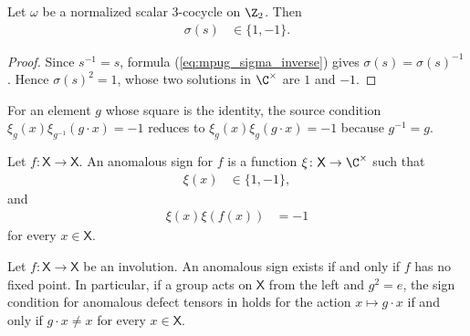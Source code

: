 \begin{lemma}
    \label{thm:mpug_z2_sigma_sign}
    \leanok
    Let $\omega$ be a normalized scalar $3$-cocycle on $\Z_2$. Then
    \begin{align}
        \sigma(s) & \in\{1,-1\}.
        \label{eq:mpug_z2_sigma_sign}
    \end{align}
\end{lemma}

\begin{proof}\leanok
    Since $s^{-1}=s$, formula (\ref{eq:mpug_sigma_inverse}) gives
    $\sigma(s)=\sigma(s)^{-1}$. Hence $\sigma(s)^2=1$, whose two solutions in
    $\C^\times$ are $1$ and $-1$.
\end{proof}

For an element $g$ whose square is the identity, the source condition
$\xi_g(x)\xi_{g^{-1}}(g\mathbin{\cdot}x)=-1$ reduces to
$\xi_g(x)\xi_g(g\mathbin{\cdot}x)=-1$ because $g^{-1}=g$.

\begin{definition}
    \label{def:mpug_anomalous_involution_sign}
    \leanok
    Let $f\colon\mathsf X\to\mathsf X$. An anomalous sign for $f$ is a
    function $\xi\colon\mathsf X\to\C^\times$ such that
    \begin{align}
        \xi(x) & \in\{1,-1\},
        \label{eq:mpug_anomalous_sign_range}
    \end{align}
    and
    \begin{align}
        \xi(x)\xi(f(x)) & =-1
        \label{eq:mpug_anomalous_sign_pairing}
    \end{align}
    for every $x\in\mathsf X$.
\end{definition}

\begin{lemma}
    \label{thm:mpug_anomalous_involution_sign_iff}
    \leanok
    Let $f\colon\mathsf X\to\mathsf X$ be an involution. An anomalous sign
    exists if and only if $f$ has no fixed point. In particular, if a group
    acts on $\mathsf X$ from the left and $g^2=e$, the sign condition for
    anomalous defect tensors in
    \cite[lines~2979--2981]{FrancoRubio2025MPUGauging} holds for the action
    $x\mapsto g\mathbin{\cdot}x$ if and only if
    $g\mathbin{\cdot}x\neq x$ for every $x\in\mathsf X$.
\end{lemma}

